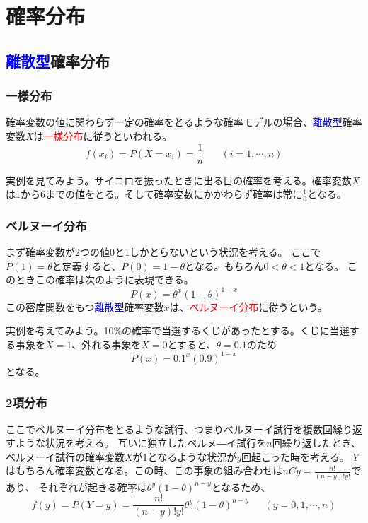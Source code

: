 \documentclass[a4paper,10pt]{jarticle}
\begin{document}
\section{確率分布}
\subsection{\textcolor{blue}{離散型}確率分布}
\subsubsection{一様分布}
確率変数の値に関わらず一定の確率をとるような確率モデルの場合、\textcolor{blue}{離散型}確率変数$X$は\textcolor{red}{一様分布}に従うといわれる。
\begin{equation}
    f(x_i) = P(X=x_i) = \frac{1}{n}\ \ \ \ \ \ \ \ (i=1,\cdots ,n)\tag{3,1}
\end{equation}

実例を見てみよう。サイコロを振ったときに出る目の確率を考える。確率変数$X$は1から6までの値をとる。そして確率変数にかかわらず確率は常に$\frac{1}{6}$となる。

\subsubsection{ベルヌーイ分布}
まず確率変数が2つの値0と1しかとらないという状況を考える。
ここで$P(1)=\theta$と定義すると、$P(0)=1-\theta$となる。もちろん$0<\theta < 1$となる。
このときこの確率は次のように表現できる。
\begin{equation}
    P(x) = \theta^x (1-\theta)^{1-x}\tag{3,2}
\end{equation}
この密度関数をもつ\textcolor{blue}{離散型}確率変数$x$は、\textcolor{red}{ベルヌーイ分布}に従うという。

実例を考えてみよう。10\%の確率で当選するくじがあったとする。くじに当選する事象を$X=1$、外れる事象を$X=0$とすると、$\theta = 0.1$のため
\begin{equation*}
    P(x) = 0.1^x(0.9)^{1-x}
\end{equation*}
となる。
\subsubsection{2項分布}
ここでベルヌーイ分布をとるような試行、つまりベルヌーイ試行を複数回繰り返すような状況を考える。
互いに独立したベルヌ―イ試行を$n$回繰り返したとき、ベルヌーイ試行の確率変数$X$が1となるような状況が$y$回起こった時を考える。
$Y$はもちろん確率変数となる。この時、この事象の組み合わせは$nCy = \frac{n!}{(n-y)!y!}$であり、
それぞれが起きる確率は$\theta^y (1-\theta)^{n-y}$となるため、
\begin{equation}
    f(y) = P(Y=y)= \frac{n!}{(n-y)!y!}\theta^y (1-\theta)^{n-y}\ \ \ \ \ \ \ (y=0,1,\cdots, n)\tag{3,3}
\end{equation}
\end{document}
